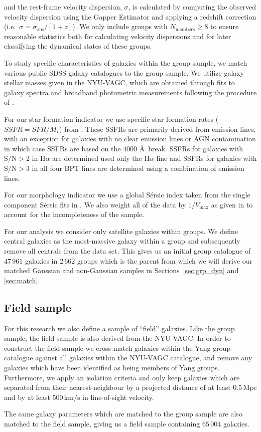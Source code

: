 \documentclass[a4paper,fleqn,usenatbib]{mnras}
\begin{document}
\noindent
and the rest-frame velocity dispersion, $\sigma$, is calculated by
computing the observed velocity dispersion using the Gapper Estimator
\citep{beers1990} and applying a redshift correction (i.e.\ $\sigma =
\sigma_\mathrm{obs}/[1+z]$).  We only include groups with
$N_\mathrm{members} \ge 8$ to ensure reasonable statistics both for
calculating velocity dispersions and for later classifying the
dynamical states of these groups.
\par
To study specific characteristics of galaxies within the group
sample, we match various public SDSS galaxy catalogues to the group
sample.  We utilize galaxy stellar masses given in the NYU-VAGC, which
are obtained through fits to galaxy spectra and broadband photometric
measurements following the procedure of \citet{blanton2007}.
\par
For our star formation indicator we use specific star formation rates
($SSFR = SFR/M_\star$) from \citet{brinchmann2004}.  These SSFRs are
primarily derived from emission lines, with an exception for galaxies
with no clear emission lines or AGN contamination in which case SSFRs
are based on the 4000 \AA\ break.  SSFRs for galaxies with $\text{S/N}
> 2$ in H$\alpha$ are determined used only the H$\alpha$ line and
SSFRs for galaxies with $\text{S/N} > 3$ in all four BPT lines are
determined using a combination of emission lines.
\par
For our morphology indicator we use a global S\'{e}rsic
index taken from the single component S\'{e}rsic fits in
\citet{simard2011}.  We also weight all of the data by
$1/V_\text{max}$ as given in \citet{simard2011} to account for the
incompleteness of the sample.
\par
For our analysis we consider only satellite galaxies within groups.
We define central galaxies as the most-massive galaxy within a group
and subsequently remove all centrals from the data set.  This gives us
an initial group catalogue of $47\,961$ galaxies in $2\,662$ groups
which is the parent from which we will derive our matched Gaussian and
non-Gaussian samples in Sections~\ref{sec:grp_dyn} and \ref{sec:match}.

\subsection{Field sample}

For this research we also define a sample of ``field'' galaxies.  Like
the group sample, the field sample is also derived from the NYU-VAGC.
In order to construct the field sample we cross-match galaxies within
the Yang group catalogue against all galaxies within the NYU-VAGC
catalogue, and remove any galaxies which have been identified as being
members of Yang groups.  Furthermore, we apply an isolation
criteria and only keep galaxies which are separated from their
nearest-neighbour by a projected distance of at least
$0.5\,\mathrm{Mpc}$ and by at least $500\,\mathrm{km/s}$ in
line-of-sight velocity.
\par
The same galaxy parameters which are matched to the group sample are
also matched to the field sample, giving us a field sample containing
$65\,004$ galaxies.
\end{document}
